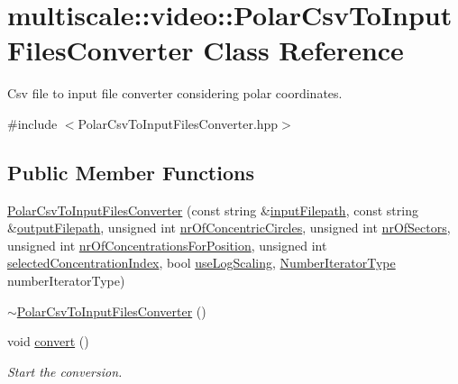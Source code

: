 \hypertarget{classmultiscale_1_1video_1_1PolarCsvToInputFilesConverter}{\section{multiscale\-:\-:video\-:\-:\-Polar\-Csv\-To\-Input\-Files\-Converter \-Class \-Reference}
\label{classmultiscale_1_1video_1_1PolarCsvToInputFilesConverter}
}


\-Csv file to input file converter considering polar coordinates.  




{\ttfamily \#include $<$\-Polar\-Csv\-To\-Input\-Files\-Converter.\-hpp$>$}

\subsection*{\-Public \-Member \-Functions}
\begin{DoxyCompactItemize}
\item 
\hyperlink{classmultiscale_1_1video_1_1PolarCsvToInputFilesConverter_a4e3b77194b9706370e25b7eeba416cda}{\-Polar\-Csv\-To\-Input\-Files\-Converter} (const string \&\hyperlink{classmultiscale_1_1video_1_1PolarCsvToInputFilesConverter_a7b33b6d00b5e0d809f4fb0d76985ab59}{input\-Filepath}, const string \&\hyperlink{classmultiscale_1_1video_1_1PolarCsvToInputFilesConverter_a1033d31c9bfc7ccad08337c7b0fa6e6e}{output\-Filepath}, unsigned int \hyperlink{classmultiscale_1_1video_1_1PolarCsvToInputFilesConverter_a7aa37d18880e822369cbe118a093e24f}{nr\-Of\-Concentric\-Circles}, unsigned int \hyperlink{classmultiscale_1_1video_1_1PolarCsvToInputFilesConverter_a9246a2c9749602af145d5579bde8a9d1}{nr\-Of\-Sectors}, unsigned int \hyperlink{classmultiscale_1_1video_1_1PolarCsvToInputFilesConverter_a3a9301788514c50c295ca113a4114938}{nr\-Of\-Concentrations\-For\-Position}, unsigned int \hyperlink{classmultiscale_1_1video_1_1PolarCsvToInputFilesConverter_a121d592659f9f5075c8c78aa46c2950c}{selected\-Concentration\-Index}, bool \hyperlink{classmultiscale_1_1video_1_1PolarCsvToInputFilesConverter_af07bf56fc39bb226a6e2596f35ada0d7}{use\-Log\-Scaling}, \hyperlink{namespacemultiscale_a6ef911f4d48a4bf5e657c237ec169ff5}{\-Number\-Iterator\-Type} number\-Iterator\-Type)
\item 
\hyperlink{classmultiscale_1_1video_1_1PolarCsvToInputFilesConverter_afdd156ae24d5d6194b113dd661110ed5}{$\sim$\-Polar\-Csv\-To\-Input\-Files\-Converter} ()
\item 
void \hyperlink{classmultiscale_1_1video_1_1PolarCsvToInputFilesConverter_a818c188569ad54cb0cfbbaa2bd32356c}{convert} ()
\begin{DoxyCompactList}\small\item\em \-Start the conversion. \end{DoxyCompactList}\end{DoxyCompactItemize}
